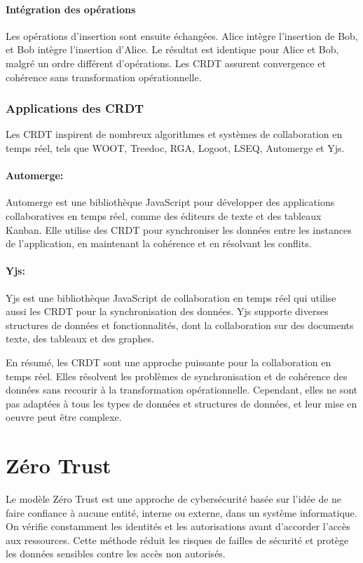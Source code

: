 \paragraph{Intégration des opérations}
Les opérations d'insertion sont ensuite échangées. Alice intègre l'insertion de Bob, et Bob intègre l'insertion d'Alice. Le résultat est identique pour Alice et Bob, malgré un ordre différent d'opérations. Les CRDT assurent convergence et cohérence sans transformation opérationnelle.

\subsubsection{Applications des CRDT}
Les CRDT inspirent de nombreux algorithmes et systèmes de collaboration en temps réel, tels que WOOT, Treedoc, RGA, Logoot, LSEQ, Automerge et Yjs.

\paragraph{Automerge\cite{hardenbergAutomerge2023}: } Automerge est une bibliothèque JavaScript pour développer des applications collaboratives en temps réel, comme des éditeurs de texte et des tableaux Kanban. Elle utilise des CRDT pour synchroniser les données entre les instances de l'application, en maintenant la cohérence et en résolvant les conflits.

\paragraph{Yjs\cite{nicolaescuYjsFrameworkRealTime2015}: } Yjs est une bibliothèque JavaScript de collaboration en temps réel qui utilise aussi les CRDT pour la synchronisation des données. Yjs supporte diverses structures de données et fonctionnalités, dont la collaboration sur des documents texte, des tableaux et des graphes.

En résumé, les CRDT sont une approche puissante pour la collaboration en temps réel. Elles résolvent les problèmes de synchronisation et de cohérence des données sans recourir à la transformation opérationnelle. Cependant, elles ne sont pas adaptées à tous les types de données et structures de données, et leur mise en oeuvre peut être complexe.

\section{Zéro Trust}
Le modèle Zéro Trust est une approche de cybersécurité basée sur l'idée de ne faire confiance à aucune entité, interne ou externe, dans un système informatique. On vérifie constamment les identités et les autorisations avant d'accorder l'accès aux ressources. Cette méthode réduit les risques de failles de sécurité et protège les données sensibles contre les accès non autorisés.

